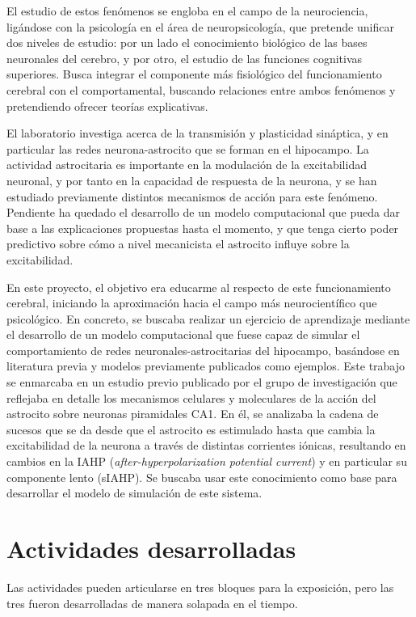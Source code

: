 \documentclass[12pt,a4paper]{report}
\begin{document}
El estudio de estos fenómenos se engloba en el campo de la neurociencia, ligándose con la psicología en el área de neuropsicología, que pretende unificar dos niveles de estudio: por un lado el conocimiento biológico de las bases neuronales del cerebro, y por otro, el estudio de las funciones cognitivas superiores. Busca integrar el componente más fisiológico del funcionamiento cerebral con el comportamental, buscando relaciones entre ambos fenómenos y pretendiendo ofrecer teorías explicativas.

El laboratorio investiga acerca de la transmisión y plasticidad sináptica, y en particular las redes neurona-astrocito que se forman en el hipocampo. La actividad astrocitaria es importante en la modulación de la excitabilidad neuronal, y por tanto en la capacidad de respuesta de la neurona, y se han estudiado previamente distintos mecanismos de acción para este fenómeno. Pendiente ha quedado el desarrollo de un modelo computacional que pueda dar base a las explicaciones propuestas hasta el momento, y que tenga cierto poder predictivo sobre cómo a nivel mecanicista el astrocito influye sobre la excitabilidad.

En este proyecto, el objetivo era educarme al respecto de este funcionamiento cerebral, iniciando la aproximación hacia el campo más neurocientífico que psicológico. En concreto, se buscaba realizar un ejercicio de aprendizaje mediante el desarrollo de un modelo computacional que fuese capaz de simular el comportamiento de redes neuronales-astrocitarias del hipocampo, basándose en literatura previa y modelos previamente publicados como ejemplos. Este trabajo se enmarcaba en un estudio previo publicado por el grupo de investigación que reflejaba en detalle los mecanismos celulares y moleculares de la acción del astrocito sobre neuronas piramidales CA1. En él, se analizaba la cadena de sucesos que se da desde que el astrocito es estimulado hasta que cambia la excitabilidad de la neurona a través de distintas corrientes iónicas, resultando en cambios en la IAHP (\textit{after-hyperpolarization potential current}) y en particular su componente lento (sIAHP). Se buscaba usar este conocimiento como base para desarrollar el modelo de simulación de este sistema.


\chapter{Actividades desarrolladas}
Las actividades pueden articularse en tres bloques para la exposición, pero las tres fueron desarrolladas de manera solapada en el tiempo.
\end{document}
